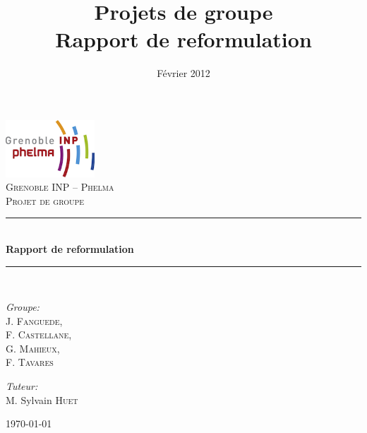 \documentclass[a4paper,12pt]{report}
\title{Projets de groupe \\ Rapport de reformulation}
\author{\bsc{J. Fanguede} \and \bsc{F. Castellane} \and \bsc{G. Mahieux} \and \bsc{F. Tavares}  }
\date{Février 2012}
\newcommand{\HRule}{\rule{\linewidth}{0.5mm}}
\begin{document}
\begin{titlepage}
	\begin{center}
	
	\includegraphics[width=0.25\textwidth]{images/smallphelma.png}\\[1.8cm]    

	\textsc{\LARGE Grenoble INP -- Phelma}\\[1.5cm]

	\textsc{\Large Projet de groupe}\\[0.5cm]


	\HRule \\[0.4cm]
	{ \huge \bfseries Rapport de reformulation}\\[0.4cm]

	\HRule \\[1.5cm]

	\begin{minipage}{0.3\textwidth}
		\begin{flushleft} \large
			\emph{Groupe:}\\
			J. \textsc{Fanguede}, \\ F. \textsc{Castellane}, \\ G. \textsc{Mahieux}, \\ F. \textsc{Tavares}
		\end{flushleft}
	\end{minipage}
	\begin{minipage}{0.4\textwidth}
		\begin{flushright} \large
			\emph{Tuteur:} \\
			M. Sylvain \textsc{Huet}
		\end{flushright}
	\end{minipage}
	\vfill

{\large \today}

\end{center}

\end{titlepage}

\end{document}
